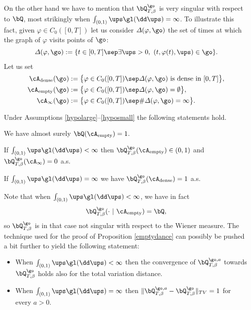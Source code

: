 On the other hand we have to mention that $\bQ^{\go}_{T,\beta}$ is very singular with respect to $\bQ$, most strikingly when $\int_{(0,1)}\ups\gl(\dd \ups)=\infty$.
To illustrate this fact, given $\varphi \in C_0([0,T])$ let us consider $\varDelta(\varphi,\go)$ the set of times at which the graph of $\varphi$ visits points of $\go$:
\begin{equation}
\label{def:Deltaphi}
\varDelta(\varphi,\go):= \{ t\in[0,T] \sep \exists \ups>0, \ (t, \varphi(t),\ups) \in \go\}.
\end{equation}
Let us set
\begin{equation}\begin{split}
\cA_{\mathrm{dense}}(\go)&:= \bigl\{ \varphi\in C_0([0,T]) \sep \varDelta(\varphi,\go) \text{ is dense in } [0,T] \bigr\}, \\
\cA_{\mathrm{empty}}(\go)&:= \bigl\{ \varphi\in C_0([0,T]) \sep \varDelta(\varphi,\go)=\emptyset \bigr\},\\
\cA_{\infty}(\go)&:= \bigl\{ \varphi\in C_0([0,T]) \sep \#\varDelta(\varphi,\go)=\infty \bigr\}.
\end{split}
\end{equation}
\begin{proposition}\label{emptydance}
Under Assumptions \eqref{hypolarge}--\eqref{hyposmall} the following statements hold.
\begin{enumeratei}
\item\label{emptydancei}
We have almost surely $\bQ(\cA_{\mathrm{empty}})=1$.
\item\label{emptydanceii}
If $\int_{(0,1)}\ups\gl(\dd \ups)<\infty$ then $\bQ^{\go}_{T,\beta} (\cA_{\mathrm{empty}})\in(0,1)$ and $\bQ^{\go}_{T,\beta}(\cA_{\infty})= 0$ a.s.
\item\label{emptydanceiii}
If $\int_{(0,1)}\ups\gl(\dd \ups)=\infty$ we have
$\bQ^{\go}_{T,\beta}(\cA_{\mathrm {dense}})= 1$ a.s.
\end{enumeratei}
\end{proposition}

\begin{rem}\label{tvtrem}
Note that when $\int_{(0,1)}\ups\gl(\dd \ups)<\infty$, we have in fact
\[
\bQ^{\go}_{T,\beta} (\cdot \ | \ \cA_{\mathrm{empty}})=\bQ,
\]
so $\bQ^{\go}_{T,\beta}$ is in that case not singular with respect to the Wiener measure.
The technique used for the proof of Proposition \ref{emptydance} can possibly be pushed a bit further to yield the following statement:
\begin{itemize}
\item When $\int_{(0,1)}\ups\gl(\dd \ups)<\infty$ then the convergence of $\bQ^{\go,a}_{T,\beta}$ towards $\bQ^{\go}_{T,\beta}$ holds also for the total variation distance.
\item When $\int_{(0,1)}\ups\gl(\dd \ups)=\infty$ then $\| \bQ^{\go,a}_{T,\beta}-\bQ^{\go}_{T,\beta}\|_{TV}=1$ for every $a>0$.
\end{itemize}

\end{rem}

